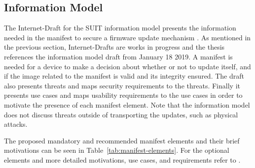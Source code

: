 \documentclass[0-thesis.tex]{subfiles}
\begin{document}
\subsection{Information Model}
\label{ssec:information-model}
The Internet-Draft for the SUIT information model presents the information needed in the
manifest to secure a firmware update mechanism \parencite{suit-information-model}. As
mentioned in the previous section, Internet-Drafts are works in progress and the thesis
references the information model draft from January 18 2019. A manifest is needed for a
device to make a decision about whether or not to update itself, and if the image related
to the manifest is valid and its integrity ensured. The draft also presents threats and
maps security requirements to the threats. Finally it presents use cases and maps
usability requirements to the use cases in order to motivate the presence of each manifest
element. Note that the information model does not discuss threats outside of transporting
the updates, such as physical attacks.

The proposed mandatory and recommended manifest elements and their brief motivations can
be seen in Table~\ref{tab:manifest-elements}. For the optional elements and more detailed
motivations, use cases, and requirements refer to \parencite{suit-information-model}.
\end{document}
